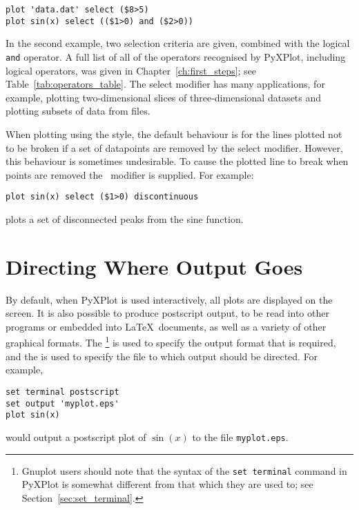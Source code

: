 \begin{verbatim}
plot 'data.dat' select ($8>5)
plot sin(x) select (($1>0) and ($2>0))
\end{verbatim}

\noindent In the second example, two selection criteria are given, combined
with the logical {\tt and} operator. A full list of all of the operators
recognised by PyXPlot, including logical operators, was given in
Chapter~\ref{ch:first_steps}; see Table~\ref{tab:operators_table}.  The select
modifier has many applications, for example, plotting two-dimensional slices of
three-dimensional datasets and plotting subsets of data from files.

When plotting using the  style, the default behaviour is for the
lines plotted not to be broken if a set of datapoints are removed by the select
modifier.  However, this behaviour is sometimes undesirable.  To cause the
plotted line to break when points are removed the \
modifier is supplied.  For example:

\begin{verbatim}
plot sin(x) select ($1>0) discontinuous
\end{verbatim}

\noindent plots a set of disconnected peaks from the sine function.

\section{Directing Where Output Goes}

\label{sec:directing_output}

By default, when PyXPlot is used interactively, all plots are displayed on the
screen. It is also possible to produce postscript output, to be read into other
programs or embedded into \LaTeX\ documents, as well as a variety of other
graphical formats. The \indcmdt{set terminal}\footnote{Gnuplot users should
note that the syntax of the {\tt set terminal} command in PyXPlot is somewhat
different from that which they are used to; see
Section~\ref{sec:set_terminal}.} is used to specify the output format that is
required, and the \indcmdt{set output} is used to specify the file to which
output should be directed. For example,

\begin{verbatim}
set terminal postscript
set output 'myplot.eps'
plot sin(x)
\end{verbatim}

\noindent would output a postscript plot of $\sin(x)$ to the file
{\tt myplot.eps}.

